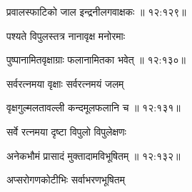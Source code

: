 {\devanagarifont प्रवालस्फाटिको जाल इन्द्रनीलगवाक्षकः {॥ १२:१२९॥} \veg\dontdisplaylinenum }%

{\devanagarifont पश्यते विपुलस्तत्र नानावृक्ष मनोरमाः \thinspace{\dandab} \dontdisplaylinenum }%


{\devanagarifont पुष्पानामितवृक्षाग्राः फलानामितका भवेत् {॥ १२:१३०॥} \veg\dontdisplaylinenum }%

{\devanagarifont सर्वरत्नमया वृक्षाः सर्वरत्नमयं जलम् \thinspace{\dandab} \dontdisplaylinenum }%


{\devanagarifont वृक्षगुल्मलतावल्ली कन्दमूलफलानि च {॥ १२:१३१॥} \veg\dontdisplaylinenum }%

{\devanagarifont सर्वे रत्नमया दृष्टा विपुलो विपुलेक्षणः \thinspace{\dandab} \dontdisplaylinenum }%


{\devanagarifont अनेकभौमं प्रासादं मुक्तादामविभूषितम् {॥ १२:१३२॥} \veg\dontdisplaylinenum }%

{\devanagarifont अप्सरोगणकोटीभिः सर्वाभरणभूषितम् \thinspace{\dandab} \dontdisplaylinenum }%
     \var{{\devanagarifont \numemph\vab \lem \mssALL, 
\lk\lk \lk\lk \lk\lk \lk\lk \lk\lk \lk\lk \lk\lk \lk\  \msNb}}%

